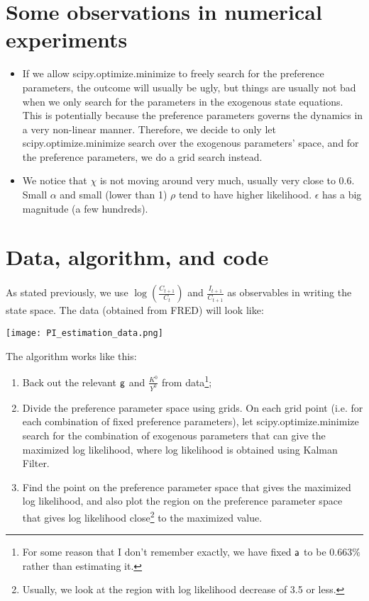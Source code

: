 \documentclass[12pt]{article}
\theoremstyle{definition}
\theoremstyle{remark}
\begin{document}
\section*{Some observations in numerical experiments}

\begin{itemize}
	\item If we allow scipy.optimize.minimize to freely search for the preference parameters, the outcome will usually be ugly, but things are usually not bad when we only search for the parameters in the exogenous state equations. This is potentially because the preference parameters governs the dynamics in a very non-linear manner. Therefore, we decide to only let scipy.optimize.minimize search over the exogenous parameters' space, and for the preference parameters, we do a grid search instead.
	\item We notice that $\chi$ is not moving around very much, usually very close to 0.6. Small $\alpha$ and small (lower than 1) $\rho$ tend to have higher likelihood. $\epsilon$ has a big magnitude (a few hundreds).
\end{itemize}

\section*{Data, algorithm, and code}

As stated previously, we use $\log\left(\frac{C_{t+1}}{C_t}\right)$ and $\frac{I_{t+1}}{C_{t+1}}$ as observables in writing the state space. The data (obtained from FRED) will look like:

\begin{center}
	\texttt{[image: PI\_estimation\_data.png]}
\end{center}

The algorithm works like this:

\begin{enumerate}
	\item Back out the relevant $\sf g$ and $\frac{K^0}{Y^0}$ from data\footnote{For some reason that I don't remember exactly, we have fixed $\sf a$ to be $0.663\%$ rather than estimating it.};
	\item Divide the preference parameter space using grids. On each grid point (i.e. for each combination of fixed preference parameters), let scipy.optimize.minimize search for the combination of exogenous parameters that can give the maximized log likelihood, where log likelihood is obtained using Kalman Filter.
	\item Find the point on the preference parameter space that gives the maximized log likelihood, and also plot the region on the preference parameter space that gives log likelihood close\footnote{Usually, we look at the region with log likelihood decrease of 3.5 or less.} to the maximized value.
\end{enumerate}
\end{document}
